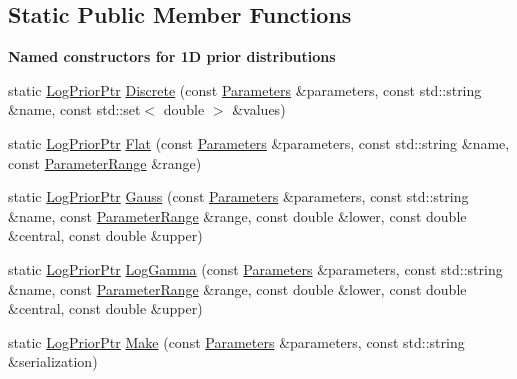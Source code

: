 \subsection*{Static Public Member Functions}
\begin{Indent}{\bf Named constructors for 1D prior distributions}\par
{\em \label{_amgrp342d5c542a047b075ed194e4a7ccb8f9}
 }\begin{DoxyCompactItemize}
\item 
static \hyperlink{namespaceeos_ac5481e3b46ee55ff24606ee7f6e78651}{LogPriorPtr} \hyperlink{classeos_1_1LogPrior_a567e0f1eba8e2dd5c019d6764cbab53c}{Discrete} (const \hyperlink{classeos_1_1Parameters}{Parameters} \&parameters, const std::string \&name, const std::set$<$ double $>$ \&values)
\item 
static \hyperlink{namespaceeos_ac5481e3b46ee55ff24606ee7f6e78651}{LogPriorPtr} \hyperlink{classeos_1_1LogPrior_ad4c2afcb1df01ef6ff1f2f8402cc7636}{Flat} (const \hyperlink{classeos_1_1Parameters}{Parameters} \&parameters, const std::string \&name, const \hyperlink{structeos_1_1ParameterRange}{ParameterRange} \&range)
\item 
static \hyperlink{namespaceeos_ac5481e3b46ee55ff24606ee7f6e78651}{LogPriorPtr} \hyperlink{classeos_1_1LogPrior_afe99a1c56a9ef60b4c38fe56f3c2b7ae}{Gauss} (const \hyperlink{classeos_1_1Parameters}{Parameters} \&parameters, const std::string \&name, const \hyperlink{structeos_1_1ParameterRange}{ParameterRange} \&range, const double \&lower, const double \&central, const double \&upper)
\item 
static \hyperlink{namespaceeos_ac5481e3b46ee55ff24606ee7f6e78651}{LogPriorPtr} \hyperlink{classeos_1_1LogPrior_af659eae53a9474695a8abadd62f82a94}{LogGamma} (const \hyperlink{classeos_1_1Parameters}{Parameters} \&parameters, const std::string \&name, const \hyperlink{structeos_1_1ParameterRange}{ParameterRange} \&range, const double \&lower, const double \&central, const double \&upper)
\item 
static \hyperlink{namespaceeos_ac5481e3b46ee55ff24606ee7f6e78651}{LogPriorPtr} \hyperlink{classeos_1_1LogPrior_a48409439aeaa34a6d0bf47ef1902749a}{Make} (const \hyperlink{classeos_1_1Parameters}{Parameters} \&parameters, const std::string \&serialization)
\end{DoxyCompactItemize}
\end{Indent}
